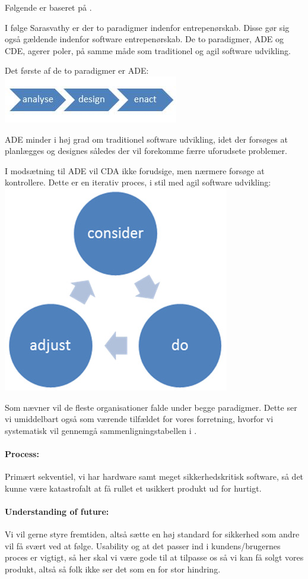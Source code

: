 Følgende er baseret på \cite[pp. 27-38]{rose2012software}.

I følge Sarasvathy er der to paradigmer indenfor entrepenørskab.
Disse gør sig også gældende indenfor software entrepenørskab.
De to paradigmer, ADE og CDE, agerer poler, på samme måde som traditionel og agil software udvikling.

Det første af de to paradigmer er ADE:\\
\centering\includegraphics[width=.5\textwidth]{graphics/ade}

ADE minder i høj grad om traditionel software udvikling, idet der forsøges at planlægges og designes således der vil forekomme færre uforudsete problemer.

I modsætning til ADE vil CDA ikke forudsige, men nærmere forsøge at kontrollere.
Dette er en iterativ proces, i stil med agil software udvikling:\\
\centering\includegraphics[width=.5\textwidth]{graphics/cda}

Som \citet{rose2012software} nævner vil de fleste organisationer falde under begge paradigmer.
Dette ser vi umiddelbart også som værende tilfældet for vores forretning, hvorfor vi systematisk vil gennemgå sammenligningstabellen i \citet[p. 38]{rose2012software}.

\paragraph{Process:} Primært sekventiel, vi har hardware samt meget sikkerhedskritisk software, så det kunne være katastrofalt at få rullet et usikkert produkt ud for hurtigt.

\paragraph{Understanding of future:} Vi vil gerne styre fremtiden, altså sætte en høj standard for sikkerhed som andre vil få svært ved at følge.
Usability og at det passer ind i kundens/brugernes proces er vigtigt, så her skal vi være gode til at tilpasse os så vi kan få solgt vores produkt, altså så folk ikke ser det som en for stor hindring.

